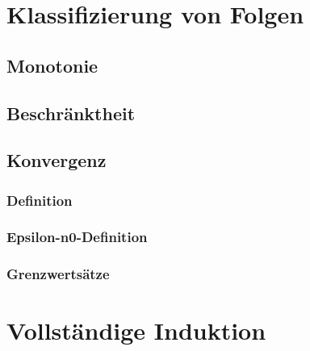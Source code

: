 		\section{Klassifizierung von Folgen}


	\subsection{Monotonie}

	\subsection{Beschränktheit}

	\subsection{Konvergenz}

\subsubsection{Definition}
\subsubsection{Epsilon-n0-Definition}
\subsubsection{Grenzwertsätze}


		\section{Vollständige Induktion}

